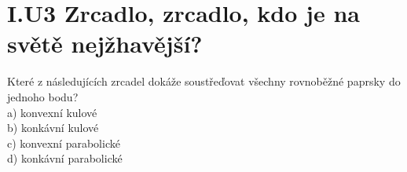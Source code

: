 \documentclass[crop=false]{standalone}
\begin{document}
\section*{I.U3 Zrcadlo, zrcadlo, kdo je na světě nejžhavější?}

Které z následujících zrcadel dokáže soustřeďovat všechny rovnoběžné paprsky do jednoho bodu?
\\

a) konvexní kulové
\\

b) konkávní kulové
\\

c) konvexní parabolické
\\

d) konkávní parabolické
\end{document}
